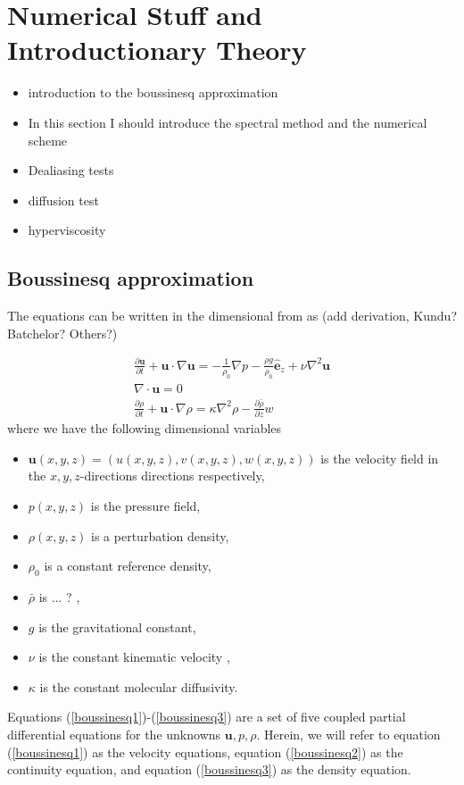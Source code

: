 \chapter{Numerical Stuff and Introductionary Theory}
\begin{itemize}
\item introduction to the boussinesq approximation 
\item In this section I should introduce the spectral method and the numerical scheme
\item Dealiasing tests 
\item  diffusion test
\item hyperviscosity
\end{itemize}
\section{Boussinesq approximation}

The equations can be written in the dimensional from as (add derivation, Kundu? Batchelor? Others?)

\begin{align}
\frac{\partial \bm{u}}{\partial t} + \bm{u}\cdot \nabla \bm{u} = -\frac{1}{\rho_{0}}\nabla p - \frac{\rho g}{\rho_{0}}\hat{\bm{e}}_{z} + \nu \nabla^{2}\bm{u} \label{boussinesq1}\\
\nabla \cdot \bm{u} =0 \label{boussinesq2}\\
\frac{\partial \rho}{\partial t} + \bm{u}\cdot \nabla \rho = \kappa \nabla^{2}\rho - \frac{\partial \bar{\rho}}{\partial z} w\label{boussinesq3}
\end{align}
where we have the following dimensional variables
\begin{itemize}
\item $\textbf{u}(x,y,z)=(u(x,y,z),v(x,y,z),w(x,y,z))$ is the velocity field in the $x,y,z$-directions directions respectively,
\item $p(x,y,z)$ is the pressure field,
\item $\rho(x,y,z)$ is a perturbation density,
\item $\rho_{0}$ is a constant reference density,
\item $\bar{\rho}$ is ... ? ,
\item $g$ is the gravitational constant,
\item $\nu$ is the constant kinematic velocity ,
\item $\kappa$ is the constant molecular diffusivity.
\end{itemize}
Equations (\ref{boussinesq1})-(\ref{boussinesq3}) are a set of five coupled partial differential equations for the unknowns $\textbf{u},p,\rho$. Herein, we will refer to equation (\ref{boussinesq1}) as the velocity equations, equation (\ref{boussinesq2}) as the continuity equation, and equation (\ref{boussinesq3}) as the density equation. 

